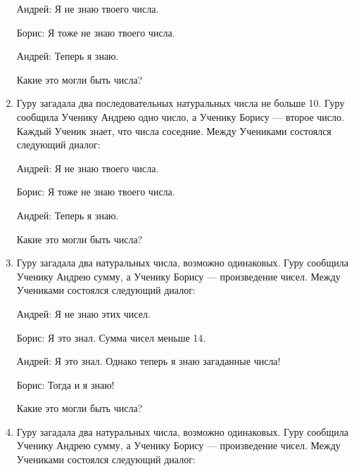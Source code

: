 \documentclass[12pt]{article}
\theoremstyle{definition}
\begin{document}
\begin{enumerate}
Андрей: Я не знаю твоего числа.

Борис: Я тоже не знаю твоего числа.

Андрей: Теперь я знаю.

Какие это могли быть числа?

\newpage
\item Гуру загадала два последовательных натуральных числа не больше 10. 
Гуру сообщила Ученику Андрею одно число, а Ученику Борису — второе число. 
Каждый Ученик знает, что числа соседние. Между Учениками состоялся следующий диалог:

Андрей: Я не знаю твоего числа.

Борис: Я тоже не знаю твоего числа.

Андрей: Теперь я знаю.

Какие это могли быть числа?



\begin{comment}
\item Альберт и Бернард только что познакомились с Шерил. Они хотят знать, когда у неё день рождения. 
Шерил предложила им десять возможных дат: 15 мая, 16 мая, 19 мая, 17 июня, 18 июня, 14 июля, 16 июля, 14 августа, 15 августа и 17 августа. 
Затем Шерил сказала Альберту месяц своего рождения, а Бернарду — день. После этого состоялся диалог.

Альберт: Я не знаю, когда у Шерил день рождения, но я знаю, что Бернард тоже не знает.

Бернард: Поначалу я не знал, когда у Шерил день рождения, но знаю теперь.

Альберт: Теперь я тоже знаю, когда у Шерил день рождения. 

Когда у Шерил день рождения?
\end{comment}


\item Гуру загадала два натуральных числа, возможно одинаковых. 
Гуру сообщила Ученику Андрею сумму, а Ученику Борису — произведение чисел. 
Между Учениками состоялся следующий диалог:

Андрей: Я не знаю этих чисел.

Борис: Я это знал. Сумма чисел меньше 14. 

Андрей: Я это знал. Однако теперь я знаю загаданные числа!

Борис: Тогда и я знаю!

Какие это могли быть числа?


\item Гуру загадала два натуральных числа, возможно одинаковых. 
Гуру сообщила Ученику Андрею сумму, а Ученику Борису — произведение чисел. 
Между Учениками состоялся следующий диалог:


\end{enumerate}
\end{document}
